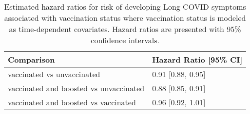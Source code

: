 \begin{table}[!htbp]
\centering
\begin{tabular}{ll}
  \hline
Comparison & Hazard Ratio [95\% CI] \\ 
  \hline
vaccinated vs unvaccinated & 0.91 [0.88, 0.95] \\ 
  vaccinated and boosted vs unvaccinated & 0.88 [0.85, 0.91] \\ 
  vaccinated and boosted vs vaccinated & 0.96 [0.92, 1.01] \\ 
   \hline
\end{tabular}
\caption{Estimated hazard ratios for risk of developing Long COVID symptoms associated with vaccination status where vaccination status is modeled as time-dependent covariates. Hazard ratios are presented with 95\% confidence intervals.} 
\label{tab:cox_time_dep_nozero_emm_pairs}
\end{table}
